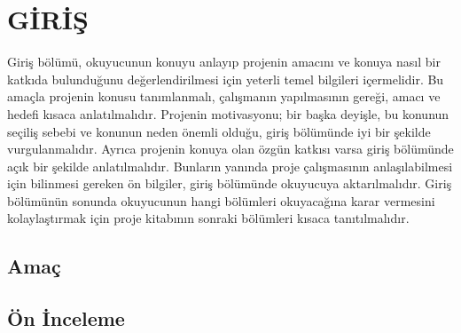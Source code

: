 \chapter{GİRİŞ}
Giriş bölümü, okuyucunun konuyu anlayıp projenin amacını ve konuya nasıl bir katkıda bulunduğunu değerlendirilmesi için yeterli temel bilgileri içermelidir. Bu amaçla projenin konusu tanımlanmalı, çalışmanın yapılmasının gereği, amacı ve hedefi kısaca anlatılmalıdır. Projenin motivasyonu; bir başka deyişle, bu konunun seçiliş sebebi ve konunun neden önemli olduğu, giriş bölümünde iyi bir şekilde vurgulanmalıdır. Ayrıca projenin konuya olan özgün katkısı varsa giriş bölümünde açık bir şekilde anlatılmalıdır. Bunların yanında proje çalışmasının anlaşılabilmesi için bilinmesi gereken ön bilgiler, giriş bölümünde okuyucuya aktarılmalıdır. Giriş bölümünün sonunda okuyucunun hangi bölümleri okuyacağına karar vermesini kolaylaştırmak için proje kitabının sonraki bölümleri kısaca tanıtılmalıdır.

\section{Amaç}

\section{Ön İnceleme}


